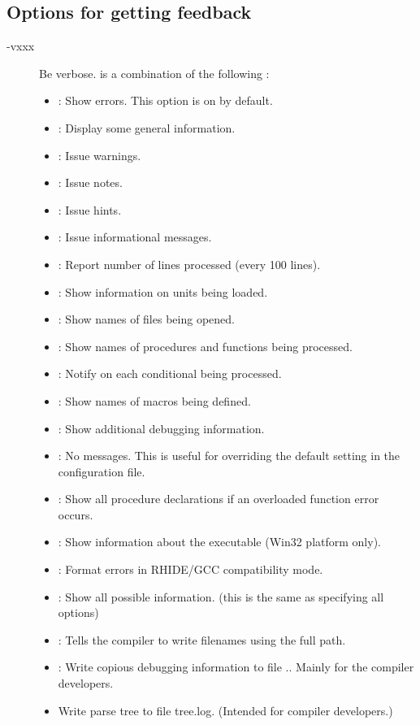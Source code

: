 \subsection{Options for getting feedback}
\label{se:feedbackoptions}
\begin{description}
\item[-vxxx] Be verbose.  is a combination of the following :
\begin{itemize}
\item {} : Show errors. This option is on by default.
\item {} : Display some general information.
\item {} : Issue warnings.
\item {} : Issue notes.
\item {} : Issue hints.
\item {} : Issue informational messages.
\item {} : Report number of lines processed (every 100 lines).
\item {} : Show information on units being loaded.
\item {} : Show names of files being opened.
\item {} : Show names of procedures and functions being processed.
\item {} : Notify on each conditional being processed.
\item {} : Show names of macros being defined.
\item {} : Show additional debugging information.
\item {} : No messages. This is useful for overriding the default
          setting in the configuration file.
\item {} : Show all procedure declarations if an overloaded function
error occurs.
\item {} : Show information about the executable (Win32 platform only).
\item {} : Format errors in RHIDE/GCC compatibility mode.
\item {} : Show all possible information. (this is the same as specifying all options)
\item {} : Tells the compiler to write filenames using the full path.
\item {} : Write copious debugging information to file
..
Mainly for the compiler developers.
\item {} Write parse tree to file tree.log. (Intended for compiler  developers.)
\end{itemize}
\end{description}
